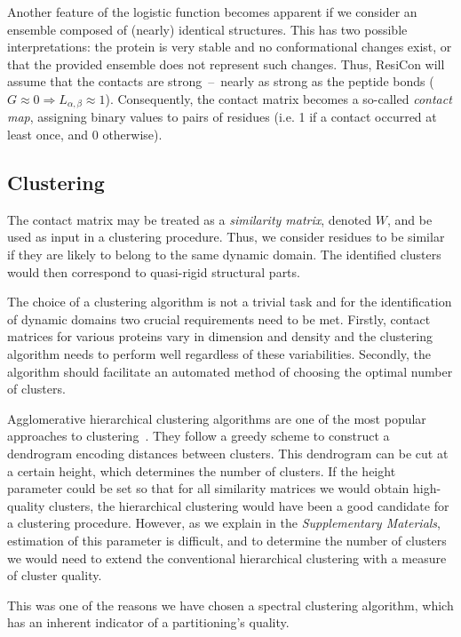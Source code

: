 \documentclass[a4paper,11pt,twoside]{book}%
\begin{document}
Another feature of the logistic function becomes apparent if we consider an ensemble composed of (nearly) identical structures.
This has two possible interpretations: the protein is very stable and no conformational changes exist, or that the provided ensemble does not represent such changes.
Thus, ResiCon will assume that the contacts are strong~--~nearly as strong as the peptide bonds ($G\approx 0 \Rightarrow L_{\alpha,\beta}\approx 1$).
Consequently, the contact matrix becomes a so-called \emph{contact map}, assigning binary values to pairs of residues (i.e. 1 if a contact occurred at least once, and 0 otherwise).

\subsection*{Clustering}

The contact matrix may be treated as a \emph{similarity matrix}, denoted $W$, and be used as input in a clustering procedure.
Thus, we consider residues to be similar if they are likely to belong to the same dynamic domain.
The identified clusters would then correspond to quasi-rigid structural parts.

The choice of a clustering algorithm is not a trivial task and for the identification of dynamic domains two crucial requirements need to be met.
Firstly, contact matrices for various proteins vary in dimension and density and the clustering algorithm needs to perform well regardless of these variabilities.
Secondly, the algorithm should facilitate an automated method of choosing the optimal number of clusters. 

Agglomerative hierarchical clustering algorithms are one of the most popular approaches to clustering~\cite{han2001data}.
They follow a greedy scheme to construct a dendrogram encoding distances between clusters.
This dendrogram can be cut at a certain height, which determines the number of clusters.
If the height parameter could be set so that for all similarity matrices we would obtain high-quality clusters, the hierarchical clustering would have been a good candidate for a clustering procedure.
However, as we explain in the \emph{Supplementary Materials}, estimation of this parameter is difficult, and to determine the number of clusters we would need to extend the conventional hierarchical clustering with a measure of cluster quality.

This was one of the reasons we have chosen a spectral clustering algorithm, which has an inherent indicator of a partitioning's quality.
\end{document}
